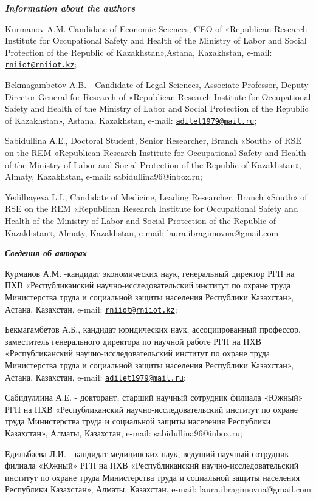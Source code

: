 \begin{authorinfo}

  \hspace{1em}\emph{{\bfseries Information about the authors}}

Kurmanov A.M.-Candidate of Economic Sciences, CEO of «Republican
Research Institute for Occupational Safety and Health of the Ministry of
Labor and Social Protection of the Republic of Kazakhstan»,Astana,
Kazakhstan, e-mail:
\href{mailto:rniiot@rniiot.kz}{\nolinkurl{rniiot@rniiot.kz}};

Bekmagambetov A.B. - Candidate of Legal Sciences, Associate Professor,
Deputy Director General for Research of «Republican Research Institute
for Occupational Safety and Health of the Ministry of Labor and Social
Protection of the Republic of Kazakhstan», Astana, Kazakhstan, e-mail:
\href{mailto:adilet1979@mail.ru}{\nolinkurl{adilet1979@mail.ru}};

Sabidullina А.Е., Doctoral Student, Senior Researcher, Branch «South» of
RSE on the REM «Republican Research Institute for Occupational Safety
and Health of the Ministry of Labor and Social Protection of the
Republic of Kazakhstan», Almaty, Kazakhstan, e-mail:
sabidullina96@inbox.ru;

Yedilbayeva L.I., Candidate of Medicine, Leading Researcher, Branch
«South» of RSE on the REM «Republican Research Institute for
Occupational Safety and Health of the Ministry of Labor and Social
Protection of the Republic of Kazakhstan», Almaty, Kazakhstan, e-mail:
laura.ibragimovna@gmail.com

\hspace{1em}\emph{{\bfseries Сведения об авторах}}

Курманов А.М. -кандидат экономических наук, генеральный директор РГП на
ПХВ «Республиканский научно-исследовательский институт по охране труда
Министерства труда и социальной защиты населения Республики Казахстан»,
Астана, Казахстан, e-mail:
\href{mailto:rniiot@rniiot.kz}{\nolinkurl{rniiot@rniiot.kz}};

Бекмагамбетов А.Б., кандидат юридических наук, ассоциированный
профессор, заместитель генерального директора по научной работе РГП на
ПХВ «Республиканский научно-исследовательский институт по охране труда
Министерства труда и социальной защиты населения Республики Казахстан»,
Астана, Казахстан, e-mail:
\href{mailto:adilet1979@mail.ru}{\nolinkurl{adilet1979@mail.ru}};

Сабидуллина А.Е. - докторант, старший научный сотрудник филиала «Южный»
РГП на ПХВ «Республиканский научно-исследовательский институт по охране
труда Министерства труда и социальной защиты населения Республики
Казахстан», Алматы, Казахстан, e-mail: sabidullina96@inbox.ru;

Едильбаева Л.И. - кандидат медицинских наук, ведущий научный сотрудник
филиала «Южный» РГП на ПХВ «Республиканский научно-исследовательский
институт по охране труда Министерства труда и социальной защиты
населения Республики Казахстан», Алматы, Казахстан, e-mail:
laura.ibragimovna@gmail.com
\end{authorinfo}
